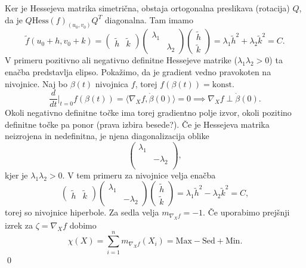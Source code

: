 Ker je Hessejeva matrika simetrična, obstaja ortogonalna preslikava (rotacija) $Q$, da je $Q\text{Hess}(f)_{(u_0,v_0)}Q^{T}$ diagonalna. Tam imamo \begin{equation*}
\tilde{f}(u_0 +h, v_0 + k) = \begin{pmatrix}
    \tilde{h} & \tilde{k} 
  \end{pmatrix}
  \begin{pmatrix}
    \lambda_1 &  \\
     & \lambda_2
  \end{pmatrix}  
  \begin{pmatrix}
    \tilde{h} \\
    \tilde{k} 
  \end{pmatrix} = \lambda_1 \tilde{h}^2 + \lambda_2 \tilde{k}^2 = C. 
\end{equation*}  
V primeru pozitivno ali negativno definitne Hessejeve matrike ($\lambda_1 \lambda_2  > 0$) ta enačba predstavlja elipso. Pokažimo, da je gradient vedno pravokoten na nivojnice. Naj bo $\beta(t)$ nivojnica $f$, torej $f(\beta(t)) = \text{konst.}$\begin{equation*}
\frac{d}{dt} \bigg|_{t = 0} f(\beta(t)) = \langle \nabla_X f, \dot{\beta}(0) \rangle  = 0 \implies \nabla_X f \perp \dot{\beta}(0).
\end{equation*}  
Okoli negativno definitne točke ima torej gradientno polje izvor, okoli pozitino definitne točke pa ponor (prava izbira besede?). Če je Hessejeva matrika neizrojena in nedefinitna, je njena diagonalizacija oblike \begin{equation*}
\begin{pmatrix}
    \lambda_1 & \\
     & -\lambda_2\\
\end{pmatrix},
\end{equation*}kjer je $\lambda_1 \lambda_2 > 0$. V tem primeru za nivojnice velja enačba \begin{equation*}
    \begin{pmatrix}
        \tilde{h} & \tilde{k} 
      \end{pmatrix}
      \begin{pmatrix}
        \lambda_1 &  \\
         & -\lambda_2
      \end{pmatrix}
      \begin{pmatrix}
        \tilde{h} \\
        \tilde{k} 
      \end{pmatrix} = \lambda_1 \tilde{h}^2 - \lambda_2 \tilde{k}^2 = C,
\end{equation*}  
torej so nivojnice hiperbole. Za sedla velja $m_{\nabla_X f} = -1$. Če uporabimo prejšnji izrek za $\zeta = \nabla_X f$ dobimo \begin{equation*}
\chi(X) = \sum_{i = 1}^{n} m_{\nabla_X f}(X_i) = \text{Max} - \text{Sed} + \text{Min}.
\end{equation*}  
\qed